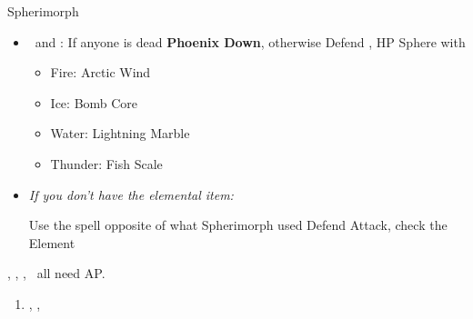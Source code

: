 \bothvfill\winvfill\lossvfill
\begin{battle}[12000]{Spherimorph}
	\begin{itemize}
		\tidusf Change Weapon to Sonic Steel
		\tidusf Defend
		\switch{\tidus}{\rikku}
		\rikkuf Grenade, check the Element
		\item \kimahri\ and \yuna: If anyone is dead \textbf{Phoenix Down}, otherwise Defend
		\rikkuf \od, HP Sphere with
		\begin{itemize}
			\item Fire: Arctic Wind
			\item Ice: Bomb Core
			\item Water: Lightning Marble
			\item Thunder: Fish Scale
		\end{itemize}
		\item \textit{If you don't have the elemental item:}
			\begin{itemize}
				\switch{\rikku}{\lulu}
				\luluf Use the spell opposite of what Spherimorph used
				\yunaf Defend
				\kimahrif Attack, check the Element
				\switch{\lulu}{\rikku}
				\rikkuf \od
			\end{itemize}
	\end{itemize}
	\tidus, \yuna, \kimahri, \rikku\ all need AP.
\end{battle}
\begin{enumerate}[resume]
	\item \cs[1:50], \sd, \sd
\end{enumerate}
\colend
